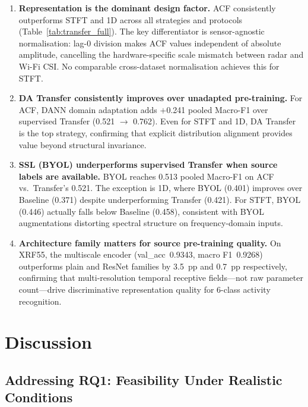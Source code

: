 \documentclass[english,bibtex]{kththesis}
\begin{document}
\begin{enumerate}
  \item \textbf{Representation is the dominant design factor.} ACF consistently outperforms STFT and 1D across all strategies and protocols (Table~\ref{tab:transfer_full}). The key differentiator is sensor-agnostic normalisation: lag-0 division makes ACF values independent of absolute amplitude, cancelling the hardware-specific scale mismatch between radar and Wi-Fi CSI. No comparable cross-dataset normalisation achieves this for STFT.

  \item \textbf{DA Transfer consistently improves over unadapted pre-training.} For ACF, DANN domain adaptation adds $+$0.241 pooled Macro-F1 over supervised Transfer (0.521 $\to$ 0.762). Even for STFT and 1D, DA Transfer is the top strategy, confirming that explicit distribution alignment provides value beyond structural invariance.

  \item \textbf{SSL (BYOL) underperforms supervised Transfer when source labels are available.} BYOL reaches 0.513 pooled Macro-F1 on ACF vs.\ Transfer's 0.521. The exception is 1D, where BYOL (0.401) improves over Baseline (0.371) despite underperforming Transfer (0.421). For STFT, BYOL (0.446) actually falls below Baseline (0.458), consistent with BYOL augmentations distorting spectral structure on frequency-domain inputs.

  \item \textbf{Architecture family matters for source pre-training quality.} On XRF55, the multiscale encoder (val\_acc~0.9343, macro F1~0.9268) outperforms plain and ResNet families by 3.5~pp and 0.7~pp respectively, confirming that multi-resolution temporal receptive fields---not raw parameter count---drive discriminative representation quality for 6-class activity recognition.
\end{enumerate}

\cleardoublepage

\chapter{Discussion}
\label{ch:discussion}

\section{Addressing RQ1: Feasibility Under Realistic Conditions}
\label{sec:rq1}
\end{document}
